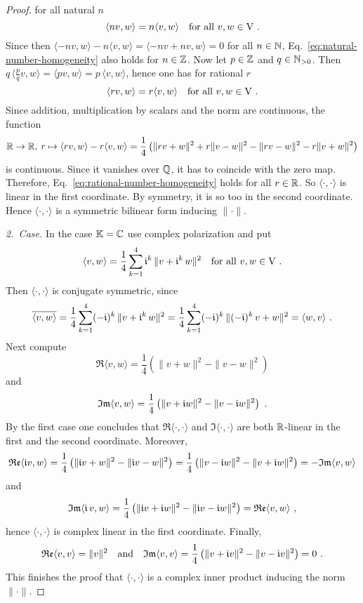 \begin{proof}
for all natural $n$
\begin{equation}
\label{eq:natural-number-homogeneity}
  \langle nv , w \rangle = n \langle v , w \rangle \quad \text{for all } v,w \in \mathrm{V}  \ . 
\end{equation}
Since then $\langle - nv , w \rangle - n \langle v , w \rangle = \langle -nv + nv , w \rangle = 0$ for all $n\in \mathbb{N}$,
Eq.~\eqref{eq:natural-number-homogeneity} also holds for $n\in \mathbb{Z}$. 
Now let $p\in \mathbb{Z}$ and $q \in \mathbb{N}_{> 0}$. Then $ q\, \langle \frac pq v , w \rangle = \langle p v , w \rangle = p \, \langle  v , w \rangle$, 
hence one has for rational $r$
\begin{equation}
\label{eq:rational-number-homogeneity}
 \langle rv , w \rangle = r \langle v , w \rangle \quad \text{for all } v,w \in \mathrm{V}  \ . 
\end{equation}
Since addition, multiplication by scalars and the norm are continuous, the function 
\[
   \mathbb{R} \to \mathbb{R}, \:r \mapsto  \langle rv , w \rangle - r \langle v , w \rangle = \frac 14 \left( \| r v + w \|^2 + r \|  v - w \|^2   - \| rv - w \|^2 -  r \|  v + w \|^2 \right) 
\]
is continuous. Since  it vanishes over $\mathbb{Q}$, it has to coincide with the zero map. Therefore, 
Eq.~\eqref{eq:rational-number-homogeneity} holds for all $r\in \mathbb{R}$. So $\langle \cdot , \cdot \rangle$ is linear in 
the first coordinate. By symmetry, it is so too in the second coordinate. Hence $\langle \cdot , \cdot \rangle$ is a 
symmetric bilinear form inducing $\| \cdot \|$. 

\textit{2.~Case.} In the case $\mathbb{K} = \mathbb{C}$ use complex polarization and put
\[
   \langle v , w \rangle = \frac 14 \sum_{k=1}^4 \mathfrak{i}^k \, \| v + \mathfrak{i}^k \, w \|^2  
   \quad \text{for all } v,w\in \mathrm{V}  \ .
\]
Then  $\langle \cdot , \cdot \rangle$ is conjugate symmetric, since 
\[
   \overline{\langle v , w \rangle} = \frac 14 \sum_{k=1}^4 (- \mathfrak{i})^k \, \| v + \mathfrak{i}^k \, w \|^2  
   =   \frac 14 \sum_{k=1}^4 (-\mathfrak{i})^k \, \| (-\mathfrak{i})^k \, v +  w \|^2 =
   \langle w , v \rangle \ .
\]
Next compute
\[
  \Re \langle v , w \rangle =  \frac 14 \left( \| v + w \|^2  - \| v - w \|^2 \right)
\]
and 
\[
  \mathfrak{Im} \langle v , w \rangle =  \frac 14 \left( \| v + \mathfrak{i} w \|^2  - \| v - \mathfrak{i} w \|^2 \right) \ .
\]
By the first case one concludes that  $\Re \langle \cdot , \cdot \rangle$ and $\Im \langle \cdot , \cdot \rangle$
are both $\mathbb{R}$-linear in the first  and the second coordinate. Moreover,
\[
  \mathfrak{Re} \langle \mathfrak{i}  v , w \rangle =  \frac 14 \left( \| \mathfrak{i} v + w \|^2  - \| \mathfrak{i} v - w \|^2 \right)
  = \frac 14 \left( \| v - \mathfrak{i} w \|^2  - \| v + \mathfrak{i} w \|^2 \right) = 
  - \mathfrak{Im} \langle v ,  w \rangle
\]
and 
\[
  \mathfrak{Im} \langle \mathfrak{i} \, v , w \rangle =  
  \frac 14 \left( \| \mathfrak{i} v + \mathfrak{i} w \|^2  - \| \mathfrak{i} v - \mathfrak{i} w \|^2 \right) = 
  \mathfrak{Re} \langle  v , w \rangle \ ,
\]
hence $\langle \cdot , \cdot \rangle$ is complex linear in the first coordinate. 
Finally,
\[
  \mathfrak{Re} \langle v , v \rangle =  \| v  \|^2 \quad \text{and} \quad 
  \mathfrak{Im} \langle v , v \rangle =  \frac 14 \left( \| v + \mathfrak{i} v \|^2  - \| v - \mathfrak{i} v \|^2 \right) = 0 \ .
\]
This finishes the proof that $ \langle \cdot , \cdot \rangle$ is a complex inner product inducing the 
norm $\| \cdot \|$.
\end{proof}

